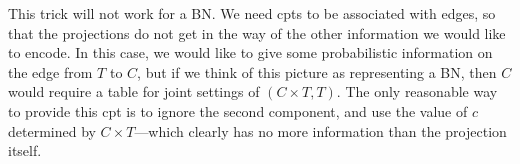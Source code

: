 \documentclass{article}
\numberwithin{equation}{section}
\begin{document}
This trick will not work for a BN. We need cpts to be associated with edges, so that the projections do not get in the way of the other information we would like to encode. In this case, we would like to give some probabilistic information on the edge from $T$ to $C$, but if we think of this picture as representing a BN, then $C$ would require a table for joint settings of $(C \times T, T)$. The only reasonable way to provide this cpt is to ignore the second component, and use the value of $c$ determined by $C \times T$---which clearly has no more information than the projection itself.    

\end{document}
